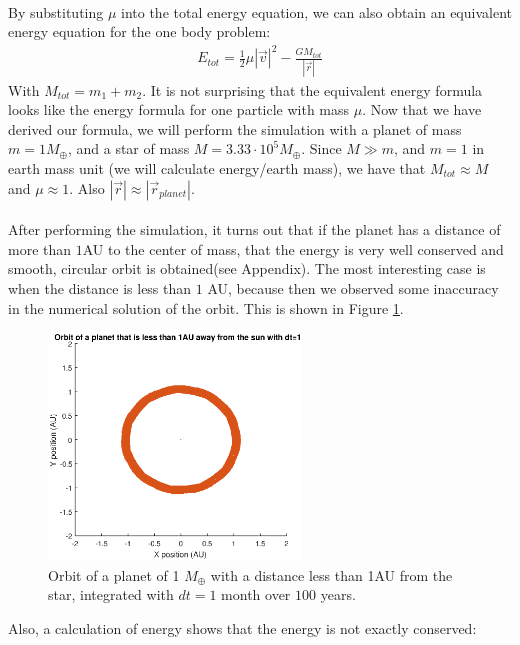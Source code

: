 \\
By substituting $\mu$ into the total energy equation, we can also obtain an equivalent energy equation for the one body problem:
\begin{align}
E_{tot}=\frac{1}{2}\mu |\vec{v}|^2-\frac{GM_{tot}}{|\vec{r}|}
\end{align}
With $M_{tot}=m_1+m_2$. It is not surprising that the equivalent energy formula looks like the energy formula for one particle with mass $\mu$. Now that we have derived our formula, we will perform the simulation with a planet of mass $m=1M_{\oplus}$, and a star of mass $M=3.33\cdot 10^5 M_{\oplus}$. Since $M\gg m$, and $m=1$ in earth mass unit (we will calculate energy/earth mass), we have that $M_{tot}\approx M$ and $\mu\approx 1$. Also $|\vec{r}|\approx |\vec{r}_{planet}|$.\\
\\
After performing the simulation, it turns out that if the planet has a distance of more than $1$AU to the center of mass, that the energy is very well conserved and smooth, circular orbit is obtained(see Appendix). The most interesting case is when the distance is less than $1$ AU, because then we observed some inaccuracy in the numerical solution of the orbit. This is shown in Figure \ref{fig:Planet1AUdt1}.
\begin{figure}[H]
\centering
\includegraphics[width=0.6\textwidth]{Planeet_1AU_dt1_100jaar.eps}
\caption{Orbit of a planet of 1 $M_{\oplus}$ with a distance less than 1AU from the star, integrated with $dt=1$ month over $100$ years.}
    \label{fig:Planet1AUdt1}
\end{figure}
Also, a calculation of energy shows that the energy is not exactly conserved:
